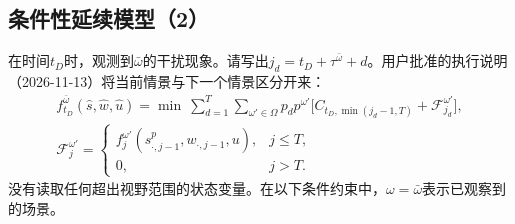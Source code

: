 \documentclass[10pt]{article}
\begin{document}
\subsection*{条件性延续模型（2）}
在时间$t_D$时，观测到$\bar\omega$的干扰现象。请写出$j_d=t_D+\tau^{\bar\omega}+d$。用户批准的执行说明（2026-11-13）将当前情景与下一个情景区分开来：
\begin{equation}
\begin{aligned}
f_{t_D}^{\bar\omega}(\hat s,\hat w,\hat u)=\min\ 
\sum_{d=1}^{T}\sum_{\omega'\in\Omega}p_d p^{\omega'}
\bigl[C_{t_D,\min(j_d-1,T)}+\mathcal F_{j_d}^{\omega'}\bigr],\\
\mathcal F_{j}^{\omega'}=
\begin{cases}f_j^{\omega'}(s_{\cdot,j-1}^p,w_{\cdot,j-1},u),&j\leq T,\\
0,&j>T.\end{cases}
\end{aligned}\tag{2a}
\end{equation}
没有读取任何超出视野范围的状态变量。在以下条件约束中，$\omega=\bar\omega$表示已观察到的场景。
\end{document}
